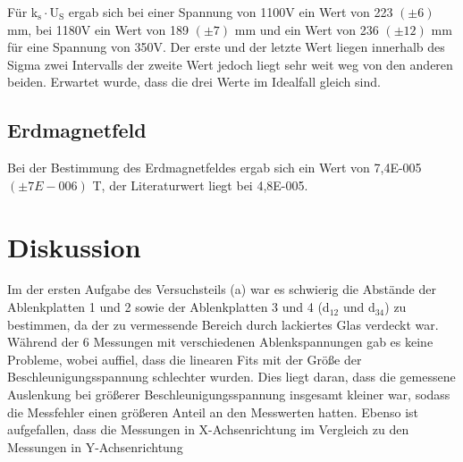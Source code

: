 \documentclass[12pt]{scrartcl}
\begin{document}
Für k$_\text{s} \cdot \text{U}_\text{S}$ ergab sich bei einer Spannung von 1100V ein Wert von 223 $(\pm 6)$ mm, bei 1180V ein Wert von 189 $(\pm 7)$ mm und ein Wert von 236 $(\pm 12)$ mm für eine Spannung von 350V. Der erste und der letzte Wert liegen innerhalb des Sigma zwei Intervalls der zweite Wert jedoch liegt sehr weit weg von den anderen beiden. Erwartet wurde, dass die drei Werte im Idealfall gleich sind.

\subsection{Erdmagnetfeld}
Bei der Bestimmung des Erdmagnetfeldes ergab sich ein Wert von 7,4E-005 $(\pm 7E-006)$ T, der Literaturwert liegt bei 4,8E-005.

\newpage
\section{Diskussion}

Im der ersten Aufgabe des Versuchsteils (a)
war es schwierig die Abstände der Ablenkplatten 1 und 2 sowie der Ablenkplatten 3 und 4 (d$_{12}$ und d$_{34}$) zu bestimmen, da der zu vermessende Bereich  durch lackiertes Glas verdeckt war.\\
Während der 6 Messungen mit verschiedenen Ablenkspannungen gab es keine Probleme, wobei auffiel, dass die linearen Fits mit der Größe der Beschleunigungsspannung schlechter wurden.
Dies liegt daran, dass die gemessene Auslenkung bei größerer Beschleunigungsspannung insgesamt kleiner war, sodass die Messfehler einen größeren Anteil an den Messwerten hatten.
Ebenso ist aufgefallen, dass die Messungen in X-Achsenrichtung im Vergleich zu den Messungen in Y-Achsenrichtung
 
\end{document}
